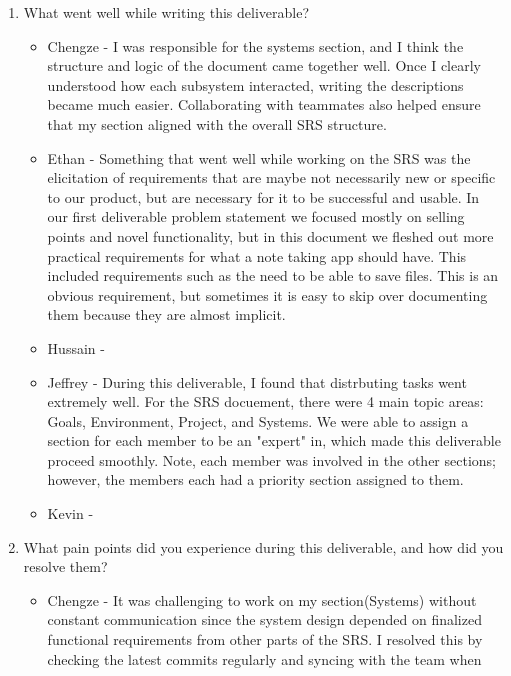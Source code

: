 \begin{enumerate}
  \item What went well while writing this deliverable?
  \begin{itemize}
        \item Chengze - I was responsible for the systems section, and 
        I think the structure and logic of the document came together 
        well. Once I clearly understood how each subsystem interacted, 
        writing the descriptions became much easier. Collaborating with 
        teammates also helped ensure that my section aligned with the 
        overall SRS structure.
        \item Ethan - Something that went well while working on the SRS was the
          elicitation of requirements that are maybe not necessarily new or
          specific to our product, but are necessary for it to be successful
          and usable. In our first deliverable problem statement we focused
          mostly on selling points and novel functionality, but in this
          document we fleshed out more practical requirements for what a note
          taking app should have. This included requirements such as the need
          to be able to save files. This is an obvious requirement, but
          sometimes it is easy to skip over documenting them because they are
          almost implicit.
        \item Hussain - 
        \item Jeffrey - During this deliverable, I found that distrbuting tasks
        went extremely well. For the SRS docuement, there were 4 main topic areas:
        Goals, Environment, Project, and Systems. We were able to assign a 
        section for each member to be an "expert" in, which made this 
        deliverable proceed smoothly. Note, each member was involved in the 
        other sections; however, the members each had a priority section assigned 
        to them. 
        \item Kevin - 
  \end{itemize} 
  \item What pain points did you experience during this deliverable, and how did
  you resolve them?
  \begin{itemize}
        \item Chengze - It was challenging to work on my section(Systems) without 
        constant communication since the system design depended on finalized 
        functional requirements from other parts of the SRS. I resolved this 
        by checking the latest commits regularly and syncing with the team when 

\end{itemize}
\end{enumerate}
